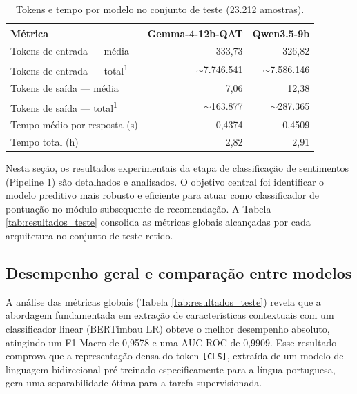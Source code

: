 \documentclass{IEEEtran}
\begin{document}
\begin{table}[htbp]
  \centering
  \caption{Tokens e tempo por modelo no conjunto de teste (23.212 amostras).}
  \label{tab:tokens-tempo-test}
  \begin{tabular}{lrr}
    \toprule
    \textbf{Métrica} & \textbf{Gemma-4-12b-QAT} & \textbf{Qwen3.5-9b} \\
    \midrule
    Tokens de entrada --- média   & 333,73        & 326,82        \\
    Tokens de entrada --- total\textsuperscript{1} & $\sim$7.746.541 & $\sim$7.586.146 \\
    Tokens de saída --- média     & 7,06          & 12,38         \\
    Tokens de saída --- total\textsuperscript{1}   & $\sim$163.877   & $\sim$287.365   \\
    Tempo médio por resposta (s)  & 0,4374        & 0,4509        \\
    Tempo total (h)               & 2,82          & 2,91          \\
    \bottomrule
  \end{tabular}

  \vspace{2pt}
\end{table}

Nesta seção, os resultados experimentais da etapa de classificação de sentimentos (Pipeline 1) são detalhados e analisados. O objetivo central foi identificar o modelo preditivo mais robusto e eficiente para atuar como classificador de pontuação no módulo subsequente de recomendação. A Tabela \ref{tab:resultados_teste} consolida as métricas globais alcançadas por cada arquitetura no conjunto de teste retido.

\subsection{Desempenho geral e comparação entre modelos}

A análise das métricas globais (Tabela \ref{tab:resultados_teste}) revela que a abordagem fundamentada em extração de características contextuais com um classificador linear (BERTimbau LR) obteve o melhor desempenho absoluto, atingindo um F1-Macro de 0,9578 e uma AUC-ROC de 0,9909. Esse resultado comprova que a representação densa do token \texttt{[CLS]}, extraída de um modelo de linguagem bidirecional pré-treinado especificamente para a língua portuguesa, gera uma separabilidade ótima para a tarefa supervisionada.
\end{document}
